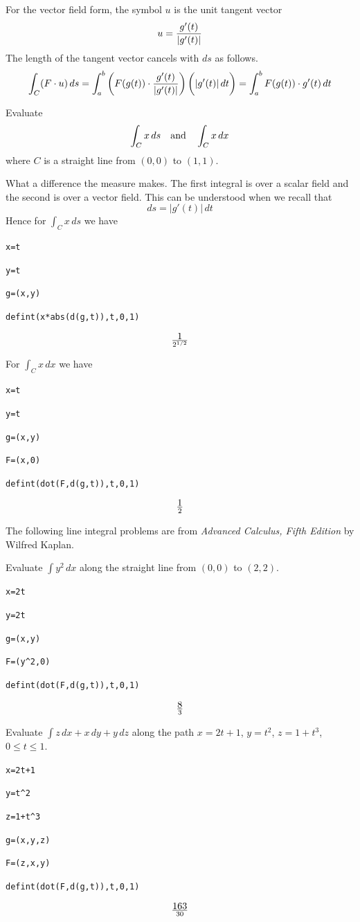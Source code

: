 \bigskip
\noindent
For the vector field form, the symbol $u$ is the unit tangent vector
$$u={g'(t)\over|g'(t)|}$$
The length of the tangent vector cancels with $ds$
as follows.
$$\int_C(F\cdot u)\,ds
=\int_a^b\bigg(F(g(t))\cdot{g'(t)\over|g'(t)|}\bigg)\,\bigg(|g'(t)|\,dt\bigg)
=\int_a^b F(g(t))\cdot g'(t)\,dt
$$

\newpage

\noindent
Evaluate
$$\int_Cx\,ds\quad\hbox{and}\quad\int_Cx\,dx$$
where $C$ is a straight line from $(0,0)$ to $(1,1)$.

\medskip
\noindent
What a difference the measure makes.
The first integral is over a scalar field and the second is over a vector field.
This can be understood when we recall that
$$ds=|g'(t)|\,dt
$$
Hence for $\int_Cx\,ds$ we have

\medskip
\verb$x=t$

\verb$y=t$

\verb$g=(x,y)$

\verb$defint(x*abs(d(g,t)),t,0,1)$

$$1\over2^{1/2}$$

\medskip
\noindent
For $\int_Cx\,dx$ we have

\medskip
\verb$x=t$

\verb$y=t$

\verb$g=(x,y)$

\verb$F=(x,0)$

\verb$defint(dot(F,d(g,t)),t,0,1)$

$$1\over2$$

\newpage

\noindent
The following line integral problems are from
{\it Advanced Calculus, Fifth Edition} by Wilfred Kaplan.

\medskip
\noindent
Evaluate $\int y^2\,dx$ along the straight
line from $(0,0)$ to $(2,2)$.

\medskip
\verb$x=2t$

\verb$y=2t$

\verb$g=(x,y)$

\verb$F=(y^2,0)$

\verb$defint(dot(F,d(g,t)),t,0,1)$

$$8\over3$$

\medskip
\noindent
Evaluate $\int z\,dx+x\,dy+y\,dz$
along the path
$x=2t+1$, $y=t^2$, $z=1+t^3$, $0\le t\le 1$.

\medskip
\verb$x=2t+1$

\verb$y=t^2$

\verb$z=1+t^3$

\verb$g=(x,y,z)$

\verb$F=(z,x,y)$

\verb$defint(dot(F,d(g,t)),t,0,1)$

$$163\over30$$

